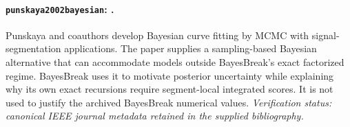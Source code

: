 
\paragraph{\texttt{punskaya2002bayesian}: \citet{punskaya2002bayesian}.}
Punskaya and coauthors develop Bayesian curve fitting by MCMC with signal-segmentation applications. The paper supplies a sampling-based Bayesian alternative that can accommodate models outside BayesBreak's exact factorized regime. BayesBreak uses it to motivate posterior uncertainty while explaining why its own exact recursions require segment-local integrated scores. It is not used to justify the archived BayesBreak numerical values. \textit{Verification status: canonical IEEE journal metadata retained in the supplied bibliography.}
